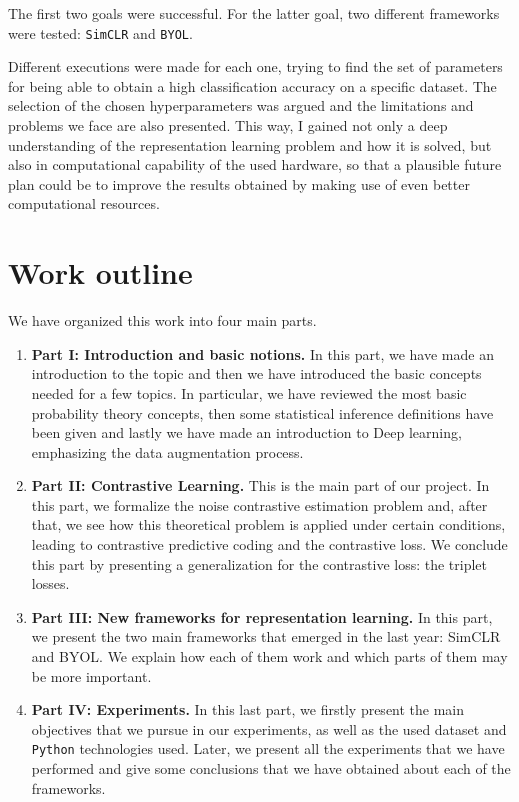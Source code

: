 The first two goals were successful. For the latter goal, two different frameworks were tested: \lstinline{SimCLR} and \lstinline{BYOL}. 

Different executions were made for each one, trying to find the set of parameters for being able to obtain a high classification accuracy on a specific dataset. The selection of the chosen hyperparameters was argued and the limitations and problems we face are also presented. This way, I gained not only a deep understanding of the representation learning problem and how it is solved, but also in computational capability of the used hardware, so that a plausible future plan could be to improve the results obtained by making use of even better computational resources.

\section*{Work outline}

We have organized this work into four main parts.

\begin{enumerate}
\item \textbf{Part I: Introduction and basic notions.} In this part, we have made an introduction to the topic and then we have introduced the basic concepts needed for a few topics. In particular, we have reviewed the most basic probability theory concepts, then some statistical inference definitions have been given and lastly we have made an introduction to Deep learning, emphasizing the data augmentation process.
\item \textbf{Part II: Contrastive Learning.} This is the main part of our project. In this part, we formalize the noise contrastive estimation problem and, after that, we see how this theoretical problem is applied under certain conditions, leading to contrastive predictive coding and the contrastive loss. We conclude this part by presenting a generalization for the contrastive loss: the triplet losses.
\item \textbf{Part III: New frameworks for representation learning.} In this part, we present the two main frameworks that emerged in the last year: SimCLR and BYOL. We explain how each of them work and which parts of them may be more important.

\item \textbf{Part IV: Experiments.} In this last part, we firstly present the main objectives that we pursue in our experiments, as well as the used dataset and \lstinline{Python} technologies used. Later, we present all the experiments that we have performed and give some conclusions that we have obtained about each of the frameworks.
\end{enumerate}
